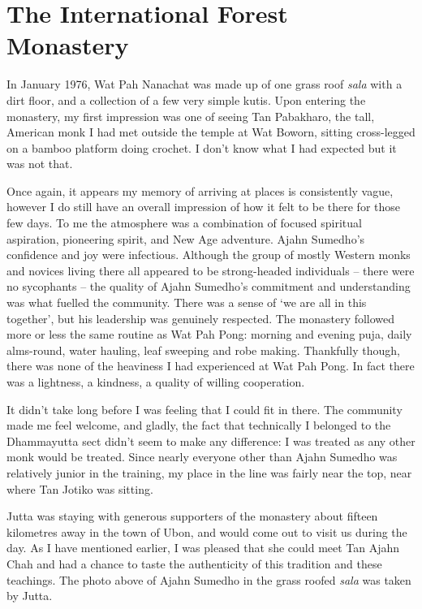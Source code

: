 \chapter{The International Forest Monastery}

In January 1976, Wat Pah Nanachat was made up of one grass roof
\emph{sala} with a dirt floor, and a collection of a few very simple
kutis. Upon entering the monastery, my first impression was one of
seeing Tan Pabakharo, the tall, American monk I had met outside the
temple at Wat Boworn, sitting cross-legged on a bamboo platform doing
crochet. I don't know what I had expected but it was not that.

Once again, it appears my memory of arriving at places is consistently
vague, however I do still have an overall impression of how it felt to
be there for those few days. To me the atmosphere was a combination of
focused spiritual aspiration, pioneering spirit, and New Age adventure.
Ajahn Sumedho's confidence and joy were infectious. Although the group
of mostly Western monks and novices living there all appeared to be
strong-headed individuals -- there were no sycophants -- the quality of
Ajahn Sumedho's commitment and understanding was what fuelled the
community. There was a sense of `we are all in this together', but his
leadership was genuinely respected. The monastery followed more or less
the same routine as Wat Pah Pong: morning and evening puja, daily
alms-round, water hauling, leaf sweeping and robe making. Thankfully
though, there was none of the heaviness I had experienced at Wat Pah
Pong. In fact there was a lightness, a kindness, a quality of willing
cooperation.


It didn't take long before I was feeling that I could fit in there. The
community made me feel welcome, and gladly, the fact that technically I
belonged to the Dhammayutta sect didn't seem to make any difference: I
was treated as any other monk would be treated. Since nearly everyone
other than Ajahn Sumedho was relatively junior in the training, my place
in the line was fairly near the top, near where Tan Jotiko was sitting.

Jutta was staying with generous supporters of the monastery about
fifteen kilometres away in the town of Ubon, and would come out to visit
us during the day. As I have mentioned earlier, I was pleased that she
could meet Tan Ajahn Chah and had a chance to taste the authenticity of
this tradition and these teachings. The photo above of Ajahn Sumedho in
the grass roofed \emph{sala} was taken by Jutta.

